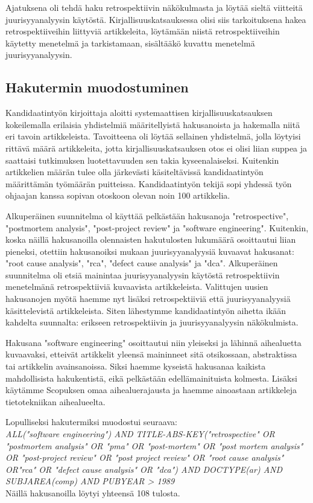 Ajatuksena oli tehdä haku retrospektiivin näkökulmasta ja löytää sieltä viitteitä juurisyyanalyysin käytöstä. Kirjallisuuskatsauksessa olisi siis tarkoituksena hakea retrospektiiveihin liittyviä artikkeleita, löytämään niistä retrospektiiveihin käytetty menetelmä ja tarkistamaan, sisältääkö kuvattu menetelmä juurisyyanalyysin.

\subsection{Hakutermin muodostuminen}
Kandidaatintyön kirjoittaja aloitti systemaattisen kirjallisuuskatsauksen kokeilemalla erilaisia yhdistelmiä määritellyistä hakusanoista ja hakemalla niitä eri tavoin artikkeleista. Tavoitteena oli löytää sellainen yhdistelmä, jolla löytyisi rittävä määrä artikkeleita, jotta kirjallisuuskatsauksen otos ei olisi liian suppea ja saattaisi tutkimuksen luotettavuuden sen takia kyseenalaiseksi. Kuitenkin artikkelien määrän tulee olla järkevästi käsiteltävissä kandidaatintyön määrittämän työmäärän puitteissa. Kandidaatintyön tekijä sopi yhdessä työn ohjaajan kanssa sopivan otoskoon olevan noin 100 artikkelia.

Alkuperäinen suunnitelma ol käyttää pelkästään hakusanoja "retrospective",  "postmortem analysis", "post-project review" ja "software engineering". Kuitenkin, koska näillä hakusanoilla olennaisten hakutulosten lukumäärä osoittautui liian pieneksi, otettiin hakusanoiksi mukaan juurisyyanalyysiä kuvaavat hakusanat: "root cause analysis", "rca", "defect cause analysis" ja "dca". 
Alkuperäinen suunnitelma oli etsiä mainintaa juurisyyanalyysin käytöstä retrospektiivin menetelmänä retrospektiiviä kuvaavista artikkeleista. Valittujen uusien hakusanojen myötä haemme nyt lisäksi retrospektiiviä että juurisyyanalyysiä käsittelevistä artikkeleista. Siten lähestymme kandidaatintyön aihetta ikään kahdelta suunnalta: erikseen retrospektiivin ja juurisyyanalyysin näkökulmista.

Hakusana "software engineering" osoittautui niin yleiseksi ja lähinnä aihealuetta kuvaavaksi, etteivät artikkelit yleensä maininneet sitä otsikossaan, abstraktissa tai artikkelin avainsanoissa. Siksi haemme kyseistä hakusanaa kaikista mahdollisista hakukentistä, eikä pelkästään edellämainituista kolmesta. Lisäksi käytämme Scopuksen omaa aihealuerajausta ja haemme ainoastaan artikkeleja tietotekniikan aihealueelta.

Lopulliseksi hakutermiksi muodostui seuraava:\\
\textit{ALL("software engineering") AND TITLE-ABS-KEY("retrospective" OR "postmortem analysis" OR "pma" OR "post-mortem" OR "post mortem analysis" OR "post-project review" OR "post project review" OR "root cause analysis" OR"rca" OR "defect cause analysis" OR "dca") AND DOCTYPE(ar) AND SUBJAREA(comp) AND PUBYEAR > 1989}\\
Näillä hakusanoilla löytyi yhteensä 108 tulosta.

